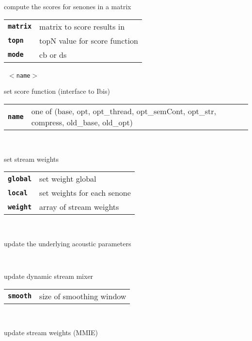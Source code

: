 \begin{description}
\begin{description}
        compute the scores for senones in a matrix

      \begin{tabular}{ll}
 \texttt{\textbf{matrix}} &  matrix to score results in \\
 \texttt{\textbf{topn}} &     topN value for score function  \\
 \texttt{\textbf{mode}} &     cb or ds  \\
      \end{tabular}
       \texttt{ $<$name$>$} \

        set score function (interface to Ibis)

      \begin{tabular}{ll}
 \texttt{\textbf{name}} &  one of (base, opt, opt\_thread, opt\_semCont, opt\_str, compress, old\_base, old\_opt)  \\
      \end{tabular}
       \texttt{   } \

        set stream weights

      \begin{tabular}{ll}
 \texttt{\textbf{global}} &  set weight global  \\
 \texttt{\textbf{local}} &   set weights for each senone  \\
 \texttt{\textbf{weight}} &  array of stream weights \\
      \end{tabular}
       \texttt{} \

        update the underlying acoustic parameters

       \texttt{ } \

        update dynamic stream mixer

      \begin{tabular}{ll}
 \texttt{\textbf{smooth}} &  size of smoothing window  \\
      \end{tabular}
       \texttt{          } \

        update stream weights (MMIE)


\end{description}
\end{description}
